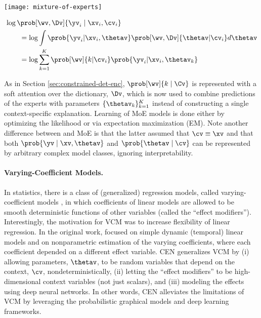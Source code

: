 \documentclass[twoside,11pt]{article}
\begin{document}
\vspace{1.3ex}
\begin{minipage}{0.37\textwidth}
    \flushleft
    \texttt{[image: mixture-of-experts]}
\end{minipage}\begin{minipage}{0.585\textwidth}
    \begin{equation}
        \label{eq:MoE-lik}
        \begin{aligned}
            \MoveEqLeft \log \prob[\wv, \Dv]{\yv_i \mid \xv_i, \cv_i} \\
            & = \log \int \prob{\yv_i | \xv_i, \thetav} \prob[\wv,\Dv]{\thetav | \cv_i} d\thetav \\
            & = \log \sum_{k=1}^K \prob[\wv]{k | \cv_i} \prob{\yv_i | \xv_i, \thetav_k}
        \end{aligned}
    \end{equation}
\end{minipage}
\vspace{1.3ex}

As in Section \ref{sec:constrained-det-enc}, \noindent $\prob[\wv]{k \mid \Cv}$ is represented with a soft attention over the dictionary, $\Dv$, which is now used to combine predictions of the experts with parameters $\{\thetav_k\}_{k=1}^K$ instead of constructing a single context-specific explanation.
Learning of MoE models is done either by optimizing the likelihood or via expectation maximization (EM).
Note another difference between {\CEN} and MoE is that the latter assumed that $\cv \equiv \xv$ and that both $\prob{\yv \mid \xv, \thetav}$ and $\prob{\thetav \mid \cv}$ can be represented by arbitrary complex model classes, ignoring interpretability.

\vspace{-1ex}
\paragraph{Varying-Coefficient Models.}
In statistics, there is a class of (generalized) regression models, called varying-coefficient models \citep[VCMs,][]{hastie1993vcm}, in which coefficients of linear models are allowed to be smooth deterministic functions of other variables (called the ``effect modifiers'').
Interestingly, the motivation for VCM was to increase flexibility of linear regression.
In the original work, \citet{hastie1993vcm} focused on simple dynamic (temporal) linear models and on nonparametric estimation of the varying coefficients, where each coefficient depended on a different effect variable.
CEN generalizes VCM by (i) allowing parameters, $\thetav$, to be random variables that depend on the context, $\cv$, nondeterministically, (ii) letting the ``effect modifiers'' to be high-dimensional context variables (not just scalars), and (iii) modeling the effects using deep neural networks.
In other words, CEN alleviates the limitations of VCM by leveraging the probabilistic graphical models and deep learning frameworks.
\end{document}
